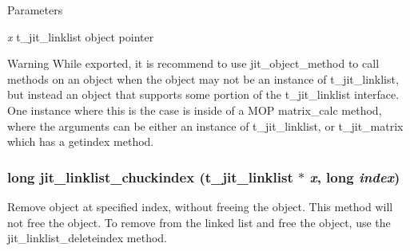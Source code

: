 \begin{DoxyParams}{Parameters}
\item[{\em x}]t\_\-jit\_\-linklist object pointer\end{DoxyParams}
\begin{DoxyWarning}{Warning}
While exported, it is recommend to use jit\_\-object\_\-method to call methods on an object when the object may not be an instance of t\_\-jit\_\-linklist, but instead an object that supports some portion of the t\_\-jit\_\-linklist interface. One instance where this is the case is inside of a MOP matrix\_\-calc method, where the arguments can be either an instance of t\_\-jit\_\-linklist, or t\_\-jit\_\-matrix which has a getindex method. 
\end{DoxyWarning}
\hypertarget{group__linklistmod_gac4958696256b4573074b1b5b48fac9db}{
\subsubsection[{jit\_\-linklist\_\-chuckindex}]{\setlength{\rightskip}{0pt plus 5cm}long jit\_\-linklist\_\-chuckindex (t\_\-jit\_\-linklist $\ast$ {\em x}, \/  long {\em index})}}
\label{group__linklistmod_gac4958696256b4573074b1b5b48fac9db}


Remove object at specified index, without freeing the object. This method will not free the object. To remove from the linked list and free the object, use the jit\_\-linklist\_\-deleteindex method.


